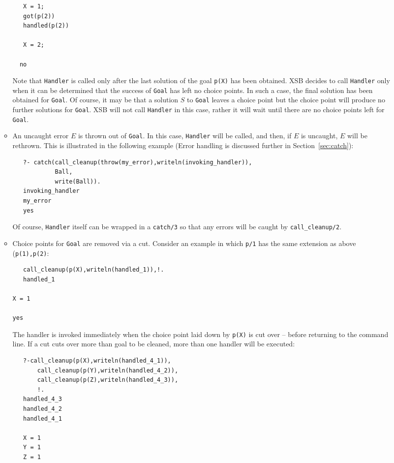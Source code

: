 \begin{description}
\begin{itemize}
\begin{itemize}
\begin{verbatim}
   X = 1;
   got(p(2))
   handled(p(2))

   X = 2;

  no
\end{verbatim}
Note that {\tt Handler} is called only after the last solution of the
goal {\tt p(X)} has been obtained.  XSB decides to call {\tt Handler}
only when it can be determined that the success of {\tt Goal} has left
no choice points.  In such a case, the final solution has been
obtained for {\tt Goal}.  Of course, it may be that a solution $S$ to
{\tt Goal} leaves a choice point but the choice point will produce no
further solutions for {\tt Goal}.  XSB will not call {\tt Handler} in
this case, rather it will wait until there are no choice points left
for {\tt Goal}.

\item An uncaught error $E$ is thrown out of {\tt Goal}.  In this
  case, {\tt Handler} will be called, and then, if $E$ is uncaught,
  $E$ will be rethrown.  This is illustrated in the following example
  (Error handling is discussed further in Section~\ref{sec:catch}):
\begin{verbatim}
   ?- catch(call_cleanup(throw(my_error),writeln(invoking_handler)),
            Ball,
            write(Ball)).
   invoking_handler
   my_error
   yes
\end{verbatim}
Of course, {\tt Handler} itself can be wrapped in a {\tt catch/3} so
that any errors will be caught by {\tt call\_cleanup/2}.

\item Choice points for {\tt Goal} are removed via a cut.  Consider an
  example in which {\tt p/1} has the same extension as above ({\tt p(1),p(2)}:
\begin{verbatim}
   call_cleanup(p(X),writeln(handled_1)),!.
   handled_1

X = 1

yes	
\end{verbatim}
The handler is invoked immediately when the choice point laid down by
{\tt p(X)} is cut over -- before returning to the command line.  If a
cut cuts over more than goal to be cleaned, more than one handler will be executed:
\begin{verbatim}
   ?-call_cleanup(p(X),writeln(handled_4_1)),
       call_cleanup(p(Y),writeln(handled_4_2)),
       call_cleanup(p(Z),writeln(handled_4_3)),
       !.
   handled_4_3
   handled_4_2
   handled_4_1
 
   X = 1
   Y = 1
   Z = 1
\end{verbatim}
\end{itemize}


\end{itemize}
\end{description}
